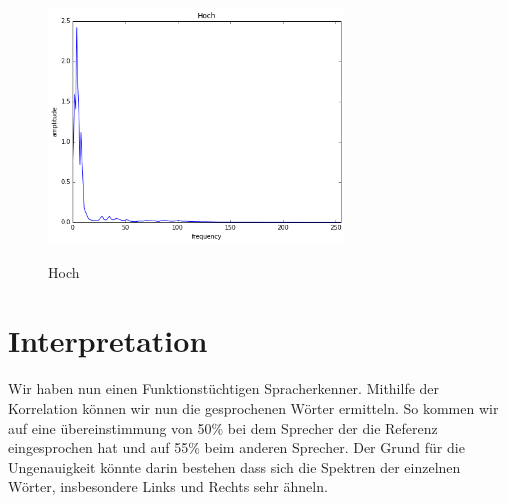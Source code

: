 \documentclass[TGAI_Laborbericht.tex]{subfiles}
\begin{document}
\begin{figure}[H]
	\includegraphics[width=0.7\textwidth]{media/hoch.png}
	\label{Hoch}
	\caption{Hoch}
\end{figure}


\section{Interpretation}
\label{chap:VERSUCH_2_INTERPRETATION}
Wir haben nun einen Funktionstüchtigen Spracherkenner. Mithilfe der Korrelation können wir nun die gesprochenen Wörter ermitteln.
So kommen wir auf eine übereinstimmung von 50\% bei dem Sprecher der die Referenz eingesprochen hat und auf 55\% beim anderen Sprecher.
Der Grund für die Ungenauigkeit könnte darin bestehen dass sich die Spektren der einzelnen Wörter, insbesondere Links und Rechts sehr ähneln.
\end{document}
